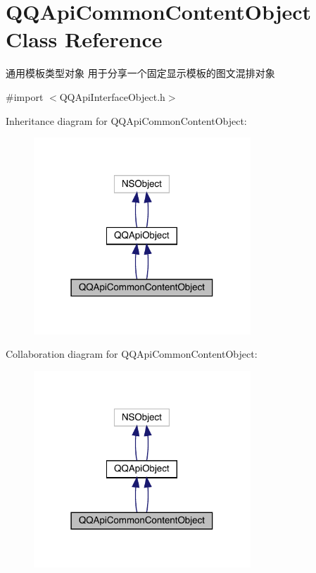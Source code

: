 \hypertarget{interface_q_q_api_common_content_object}{}\section{Q\+Q\+Api\+Common\+Content\+Object Class Reference}
\label{interface_q_q_api_common_content_object}


通用模板类型对象 用于分享一个固定显示模板的图文混排对象  




{\ttfamily \#import $<$Q\+Q\+Api\+Interface\+Object.\+h$>$}



Inheritance diagram for Q\+Q\+Api\+Common\+Content\+Object\+:\nopagebreak
\begin{figure}[H]
\begin{center}
\leavevmode
\includegraphics[width=231pt]{interface_q_q_api_common_content_object__inherit__graph}
\end{center}
\end{figure}


Collaboration diagram for Q\+Q\+Api\+Common\+Content\+Object\+:\nopagebreak
\begin{figure}[H]
\begin{center}
\leavevmode
\includegraphics[width=231pt]{interface_q_q_api_common_content_object__coll__graph}
\end{center}
\end{figure}
